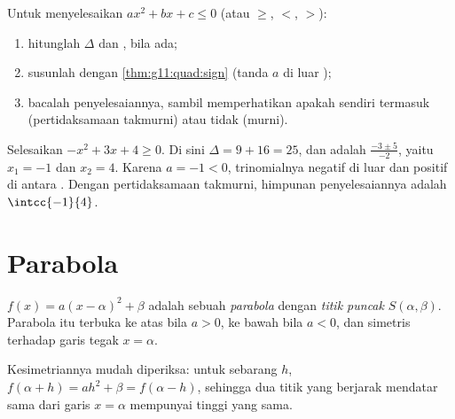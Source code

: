 \begin{method}\label{met:g11:quad:inequalities}
Untuk menyelesaikan $ax^2 + bx + c \leq 0$ (atau $\geq$, $<$, $>$):
\begin{enumerate}
  \item hitunglah $\Delta$ dan , bila ada;
  \item susunlah  dengan \cref{thm:g11:quad:sign} (tanda $a$
        di luar );
  \item bacalah  penyelesaiannya, sambil memperhatikan apakah
         sendiri termasuk (pertidaksamaan takmurni) atau tidak (murni).
\end{enumerate}
\end{method}

\begin{example}\label{ex:g11:quad:inequality}
Selesaikan $-x^2 + 3x + 4 \geq 0$. Di sini $\Delta = 9 + 16 = 25$, dan 
adalah $\frac{-3 \pm 5}{-2}$, yaitu $x_1 = -1$ dan $x_2 = 4$. Karena
$a = -1 < 0$, trinomialnya negatif di luar  dan positif
di antara . Dengan pertidaksamaan takmurni, himpunan penyelesaiannya
adalah $\intcc{-1}{4}$.
\end{example}

\section{Parabola}

\begin{definition}[Parabola]\label{def:g11:quad:parabola}
  $f(x) = a(x-\alpha)^2+\beta$ adalah sebuah
\emph{parabola} dengan \emph{titik puncak} $S(\alpha, \beta)$.
Parabola itu terbuka ke atas bila $a > 0$, ke bawah bila $a < 0$, dan simetris
terhadap garis tegak $x = \alpha$.
\end{definition}

\begin{remark}
Kesimetriannya mudah diperiksa: untuk sebarang $h$,
$f(\alpha + h) = ah^2 + \beta = f(\alpha - h)$, sehingga dua titik yang berjarak
mendatar sama dari garis $x = \alpha$ mempunyai tinggi yang sama.
\end{remark}

